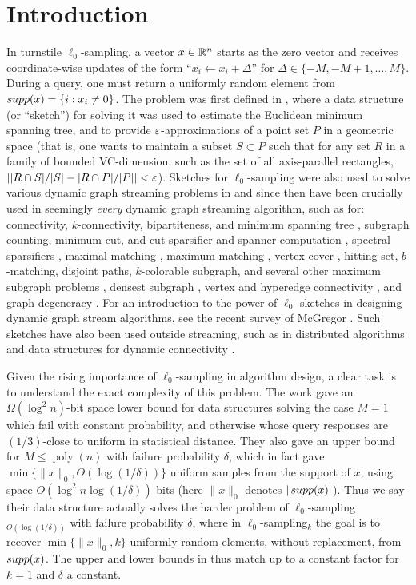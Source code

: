 \section{Introduction}
In turnstile $\ell_0$-sampling, a vector $x\in\mathbb{R}^n$ starts as the zero vector and receives coordinate-wise updates of the form ``$x_i \leftarrow x_i + \Delta$'' for $\Delta\in\{-M,-M+1,\ldots,M\}$. During a query, one must return a uniformly random element from $\mathop{supp}(x) = \{i : x_i\neq 0\}$. The problem was first defined in \cite{FrahlingIS08}, where a data structure (or ``sketch'') for solving it was used to estimate the Euclidean minimum spanning tree, and to provide $\varepsilon$-approximations of a point set $P$ in a geometric space (that is, one wants to maintain a subset $S\subset P$ such that for any set $R$ in a family of bounded VC-dimension, such as the set of all axis-parallel rectangles, $||R\cap S|/|S| - |R\cap P|/|P|| < \varepsilon$). Sketches for $\ell_0$-sampling were also used to solve various dynamic graph streaming problems in \cite{AhnGM12a} and since then have been crucially used in seemingly {\em every} dynamic graph streaming algorithm, such as for: connectivity, $k$-connectivity, bipartiteness, and minimum spanning tree \cite{AhnGM12a}, subgraph counting, minimum cut, and cut-sparsifier and spanner computation \cite{AhnGM12b}, spectral sparsifiers \cite{AhnGM13}, maximal matching \cite{ChitnisCHM15}, maximum matching \cite{AhnGM12a,BuryS15,Konrad15,AssadiKLY16,ChitnisCEHMMV16,AssadiKL17}, vertex cover \cite{ChitnisCHM15,ChitnisCEHMMV16}, hitting set, $b$-matching, disjoint paths, $k$-colorable subgraph, and several other maximum subgraph problems \cite{ChitnisCEHMMV16}, densest subgraph \cite{BhattacharyaHNT15,McGregorTVV15,EsfandiariHW16}, vertex and hyperedge connectivity \cite{GuhaMT15}, and graph degeneracy \cite{FarachColtonT16}. For an introduction to the power of $\ell_0$-sketches in designing dynamic graph stream algorithms, see the recent survey of McGregor \cite[Section 3]{McGregor14}. Such sketches have also been used outside streaming, such as in distributed algorithms \cite{HegemanPPSS15,Pandurangan0S16} and data structures for dynamic connectivity \cite{KapronKM13,Wang15,GibbKKT15}.

Given the rising importance of $\ell_0$-sampling in algorithm design, a clear task is to understand the exact complexity of this problem. The work \cite{JowhariST11} gave an $\Omega(\log^2 n)$-bit space lower bound for data structures solving the case $M=1$ which fail with constant probability, and otherwise whose query responses are $(1/3)$-close to uniform in statistical distance. They also gave an upper bound for $M \le \mathop{poly}(n)$ with failure probability $\delta$, which in fact gave $\min\{\|x\|_0, \Theta(\log(1/\delta))\}$ uniform samples from the support of $x$, using space $O(\log^2 n \log(1/\delta))$ bits (here $\|x\|_0$ denotes $|\mathop{supp}(x)|$). Thus we say their data structure actually solves the harder problem of $\ell_0$-sampling$_{\Theta(\log(1/\delta))}$ with failure probability $\delta$, where in $\ell_0$-sampling$_k$ the goal is to recover $\min\{\|x\|_0, k\}$ uniformly random elements, without replacement, from $\mathop{supp}(x)$.  The upper and lower bounds in \cite{JowhariST11} thus match up to a constant factor for $k = 1$ and $\delta$ a constant.

